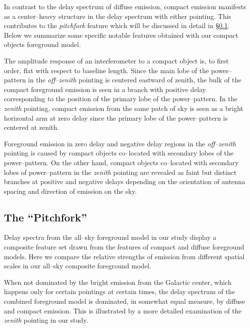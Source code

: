 \documentclass[preprint2,iop,numberedappendix]{emulateapj}
\begin{document}
In contrast to the delay spectrum of diffuse emission, compact emission manifests as a center--heavy structure in the delay spectrum with either pointing. This contributes to the {\it pitchfork} feature which will be discussed in detail in \S\ref{sec:composite}. Below we summarize some specific notable features obtained with our compact objects foreground model.


The amplitude response of an interferometer to a compact object is, to first order, flat with respect to baseline length. Since the main lobe of the power--pattern in the {\it off--zenith} pointing is centered eastward of zenith, the bulk of the compact foreground emission is seen in a branch with positive delay corresponding to the position of the primary lobe of the power--pattern. In the {\it zenith} pointing, compact emission from the same patch of sky is seen as a bright horizontal arm at zero delay  since the primary lobe of the power--pattern is centered at zenith. 

Foreground emission in zero delay and negative delay regions in the {\it off--zenith} pointing is caused by compact objects co--located with secondary lobes of the power--pattern. On the other hand, compact objects co--located with secondary lobes of power--pattern in the {\it zenith} pointing are revealed as faint but distinct branches at positive and negative delays depending on the orientation of antenna spacing and direction of emission on the sky. 

\subsection{The ``Pitchfork''}\label{sec:composite}

Delay spectra from the all--sky foreground model in our study display a composite feature set drawn from the features of compact and diffuse foreground models. Here we compare the relative strengths of emission from different spatial scales in our all--sky composite foreground model. 

When not dominated by the bright emission from the Galactic center, which happens only for certain pointings at certain times, the delay spectrum of the combined foreground model is dominated, in somewhat equal measure, by diffuse and compact emission. This is illustrated by a more detailed examination of the {\it zenith} pointing in our study. 
\end{document}
